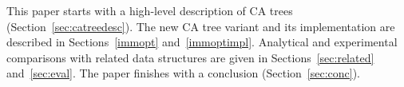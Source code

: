 \documentclass[a4paper,UKenglish]{oasics-v2016}
\begin{document}


This paper starts with a high-level description of CA trees (Section~\ref{sec:catreedesc}).
The new CA tree variant and its implementation are described in Sections~\ref{immopt} and~\ref{immoptimpl}.
Analytical and experimental comparisons with related data structures are given in Sections~\ref{sec:related} and~\ref{sec:eval}.
The paper finishes with a conclusion (Section~\ref{sec:conc}). 
\end{document}
